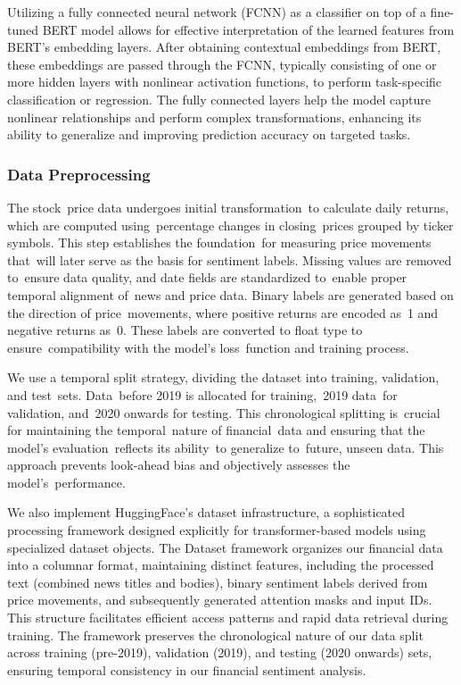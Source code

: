 \documentclass[12pt]{article}
\begin{document}
Utilizing a fully connected neural network (FCNN) as a classifier on top of a fine-tuned BERT model allows for effective interpretation of the learned features from BERT's embedding layers. After obtaining contextual embeddings from BERT, these embeddings are passed through the FCNN, typically consisting of one or more hidden layers with nonlinear activation functions, to perform task-specific classification or regression. The fully connected layers help the model capture nonlinear relationships and perform complex transformations, enhancing its ability to generalize and improving prediction accuracy on targeted tasks.

\subsubsection*{Data Preprocessing}

The stock price data undergoes initial transformation to calculate daily returns, which are computed using percentage changes in closing prices grouped by ticker symbols. This step establishes the foundation for measuring price movements that will later serve as the basis for sentiment labels. Missing values are removed to ensure data quality, and date fields are standardized to enable proper temporal alignment of news and price data. Binary labels are generated based on the direction of price movements, where positive returns are encoded as 1 and negative returns as 0. These labels are converted to float type to ensure compatibility with the model's loss function and training process.

We use a temporal split strategy, dividing the dataset into training, validation, and test sets. Data before 2019 is allocated for training, 2019 data for validation, and 2020 onwards for testing. This chronological splitting is crucial for maintaining the temporal nature of financial data and ensuring that the model's evaluation reflects its ability to generalize to future, unseen data. This approach prevents look-ahead bias and objectively assesses the model's performance.

We also implement HuggingFace's dataset infrastructure, a sophisticated processing framework designed explicitly for transformer-based models using specialized dataset objects. The Dataset framework organizes our financial data into a columnar format, maintaining distinct features, including the processed text (combined news titles and bodies), binary sentiment labels derived from price movements, and subsequently generated attention masks and input IDs. This structure facilitates efficient access patterns and rapid data retrieval during training. The framework preserves the chronological nature of our data split across training (pre-2019), validation (2019), and testing (2020 onwards) sets, ensuring temporal consistency in our financial sentiment analysis.
\end{document}

